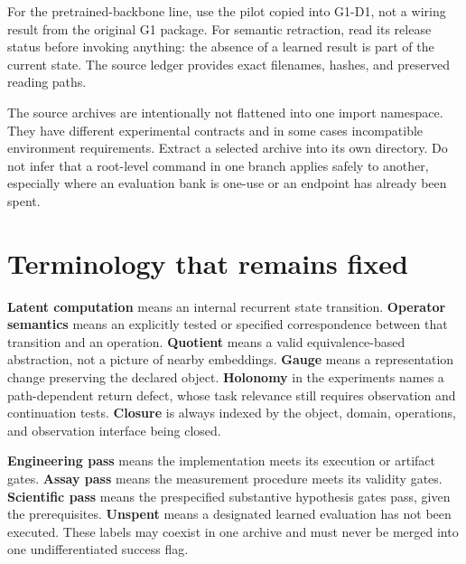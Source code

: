 \documentclass[11pt]{article}
\begin{document}
For the pretrained-backbone line, use the pilot copied into G1-D1, not a wiring result from the original G1 package. For semantic retraction, read its release status before invoking anything: the absence of a learned result is part of the current state. The source ledger provides exact filenames, hashes, and preserved reading paths.

The source archives are intentionally not flattened into one import namespace. They have different experimental contracts and in some cases incompatible environment requirements. Extract a selected archive into its own directory. Do not infer that a root-level command in one branch applies safely to another, especially where an evaluation bank is one-use or an endpoint has already been spent.

\section{Terminology that remains fixed}
\textbf{Latent computation} means an internal recurrent state transition. \textbf{Operator semantics} means an explicitly tested or specified correspondence between that transition and an operation. \textbf{Quotient} means a valid equivalence-based abstraction, not a picture of nearby embeddings. \textbf{Gauge} means a representation change preserving the declared object. \textbf{Holonomy} in the experiments names a path-dependent return defect, whose task relevance still requires observation and continuation tests. \textbf{Closure} is always indexed by the object, domain, operations, and observation interface being closed.

\textbf{Engineering pass} means the implementation meets its execution or artifact gates. \textbf{Assay pass} means the measurement procedure meets its validity gates. \textbf{Scientific pass} means the prespecified substantive hypothesis gates pass, given the prerequisites. \textbf{Unspent} means a designated learned evaluation has not been executed. These labels may coexist in one archive and must never be merged into one undifferentiated success flag.
\end{document}
